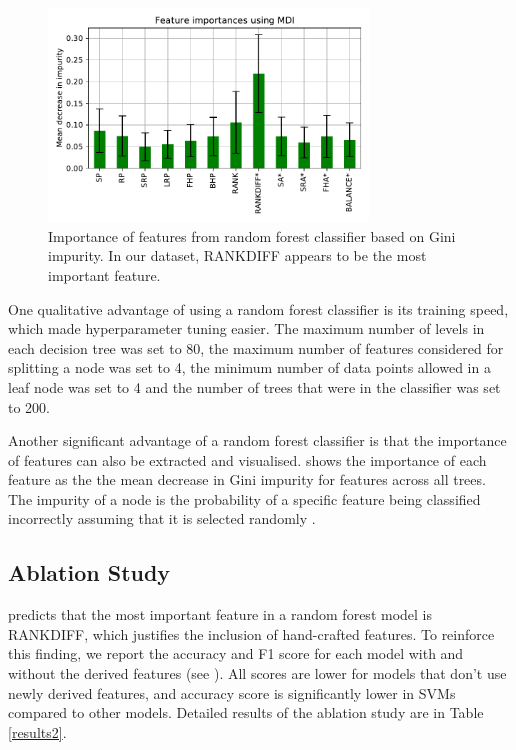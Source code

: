 
\begin{figure}[b]

\includegraphics[width=8.5cm]{plots/feature_importance.pdf}
\caption{Importance of features from random forest classifier based on Gini impurity. In our dataset, RANKDIFF appears to be the most important feature.}

\label{fig:fig4}
\centering
\end{figure}

One qualitative advantage of using a random forest classifier is its training speed, which made hyperparameter tuning easier. The maximum number of levels in each decision tree was set to 80, the maximum number of features considered for splitting a node was set to 4, the minimum number of data points allowed in a leaf node was set to 4 and the number of trees that were in the classifier was set to 200.

Another significant advantage of a random forest classifier is that the importance of features can also be extracted and visualised.   shows the importance of each feature as the the mean decrease in Gini impurity for features across all trees. The impurity of a node is the probability of a specific feature being classified incorrectly assuming that it is selected randomly \cite{cassidy2014calculating}.


\subsection{Ablation Study}
 predicts that the most important feature in a random forest model is  RANKDIFF, which justifies the inclusion of hand-crafted features. To reinforce this finding, we report the accuracy and F1 score for each model with and without the derived features (see ). All scores are lower for models that don't use newly derived features, and accuracy score is significantly lower in SVMs compared to other models. Detailed results of the ablation study are  in Table \ref{results2}.

